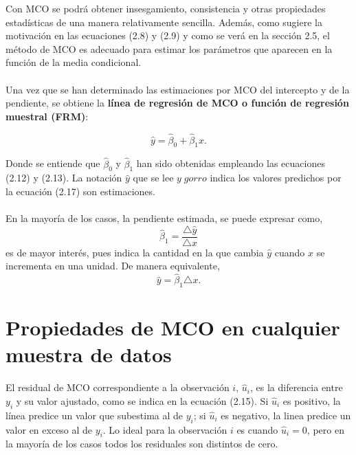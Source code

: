 Con MCO se podrá obtener insesgamiento, consistencia y otras propiedades estadísticas de una manera relativamente sencilla. Además, como sugiere la motivación en las ecuaciones (2.8) y (2.9)  y como se verá en la sección 2.5, el método de MCO es adecuado para estimar los parámetros que aparecen en la función de la media condicional.\\\\

Una vez que se han determinado las estimaciones por MCO del intercepto y de la pendiente,
se obtiene la \textbf{línea de regresión de MCO o función de regresión muestral (FRM)}:

\begin{tcolorbox}[colframe=white]
    \begin{equation}
	\hat{y} = \hat{\beta}_0 + \hat{\beta}_1 x.
    \end{equation}
\end{tcolorbox}

Donde se entiende que $\hat{\beta}_0$ y $\hat{\beta}_1$ han sido obtenidas empleando las ecuaciones (2.12) y (2.13). La notación $\hat{y}$ que se lee $y \; gorro$ indica los valores predichos por la ecuación (2.17) son estimaciones. \\\\
En la mayoría de los casos, la pendiente estimada, se puede expresar como,
\begin{equation}
    \hat{\beta}_1 = \dfrac{\triangle \hat{y}}{\triangle x}
\end{equation}
es de mayor interés, pues indica la cantidad en la que cambia $\hat{y}$ cuando $x$ se incrementa en una unidad. De manera equivalente,
\begin{equation}
    \hat{y} =  \hat{\beta}_1 \triangle x.
\end{equation}

\section{Propiedades de MCO en cualquier muestra de datos}
El residual de MCO correspondiente a la observación $i$, $\hat{u}_i$, es la diferencia entre $y_i$ y su valor ajustado, como se indica en la ecuación (2.15). Si $\hat{u}_i$ es positivo, la línea predice un valor que subestima al de $y_i$; si $\hat{u}_i$ es negativo, la linea predice un valor en exceso al de $y_i$. Lo ideal para la observación $i$ es cuando $\hat{u}_i = 0$, pero en la mayoría de los casos todos los residuales son distintos de cero. 

